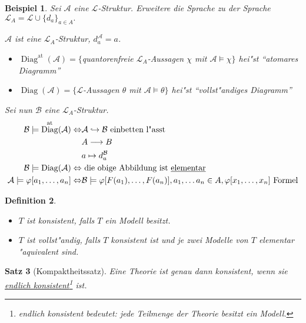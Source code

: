 \documentclass[a4paper,12pt,numbers=noenddot,parskip=full]{scrartcl}
\newcommand{\scrL}{\mathcal{L}}
\newcommand{\scrA}{\mathcal{A}}
\newcommand{\scrB}{\mathcal{B}}
\DeclareMathOperator{\Diag}{Diag}
\newcommand{\atdig}{\Diag^{\text{at}}}
\newcommand{\vdig}{\Diag}
\theoremstyle{dotless}
\newtheorem{theorem}{Satz}[section]
\newtheorem{definition}[theorem]{Definition}
\newtheorem{example}[theorem]{Beispiel}
\theoremstyle{remark}
\begin{document}
\begin{example}
	Sei $\scrA$ eine $\scrL$-Struktur. Erweitere die Sprache zu der Sprache $\scrL_A = \scrL \cup \{d_a\}_{a \in A}.$
	
	$\scrA$ ist eine $\scrL_A$-Struktur, $d_a^\scrA = a$.
	\begin{itemize}
		\item $\atdig(\scrA) = \{$quantorenfreie $\scrL_A$-Aussagen $\chi$ mit $\scrA \models \chi\}$ hei"st "`atomares Diagramm"'
		\item $\vdig (\scrA) = \{\scrL$-Aussagen $\theta$ mit $\scrA \models \theta\}$ hei"st "`vollst"andiges Diagramm"'
	\end{itemize}
	Sei nun $\scrB$ eine $\scrL_A$-Struktur.
	\begin{align*}
		\scrB \models \atdig(\scrA) \Leftrightarrow &\scrA \hookrightarrow \scrB \text{ einbetten l"asst}\\
		&A \longrightarrow B\\
		&a \mapsto d_a^\scrB\\
		\scrB \models \vdig(\scrA) \Leftrightarrow &\text{ die obige Abbildung ist \underline{elementar}}\\
		\scrA \models \varphi[a_1, \dots, a_n] \Leftrightarrow &\scrB \models \varphi [F(a_1), \dots, F(a_n)], a_1, \dots a_n \in A, \varphi[x_1, \dots, x_n] \text{ Formel}
	\end{align*}
\end{example}

\begin{definition}
	\begin{itemize}
		\item $T$ ist konsistent, falls $T$ ein Modell besitzt.
		\item $T$ ist vollst"andig, falls  $T$ konsistent ist und je zwei Modelle von $T$ elementar "aquivalent sind.
	\end{itemize}
\end{definition}

\begin{theorem}[Kompaktheitssatz]
	Eine Theorie ist genau dann konsistent, wenn sie \underline{endlich konsistent}\footnote{endlich konsistent bedeutet: jede Teilmenge der Theorie besitzt ein Modell.} ist.
\end{theorem}
\end{document}

